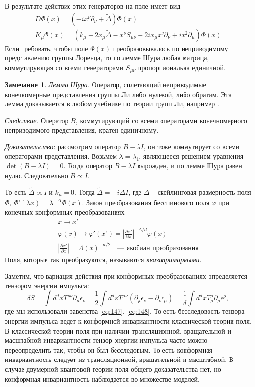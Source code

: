 \documentclass[a4paper,12pt]{article}
\theoremstyle{definition}
\theoremstyle{definition}
\newtheorem{mynote}{Замечание}[section]
\theoremstyle{definition}
\begin{document}
В результате действие этих генераторов на поле имеет вид
\begin{eqnarray}
  \label{eq:181}
  D\Phi(x)=(-ix^{\nu}\partial_{\nu}+\tilde \Delta)\Phi(x)\\
  K_{\mu}\Phi(x)=(k_{\mu}+2x_{\mu}\tilde\Delta -x^{\nu}S_{\mu\nu}-2ix_{\mu}x^{\nu}\partial_{\nu}+ix^{2} \partial_{\mu})\Phi(x)
\end{eqnarray}
Если требовать, чтобы поле $\Phi(x)$ преобразовывалось по неприводимому представлению группы Лоренца, то по лемме Шура любая матрица, коммутирующая со всеми генераторами $S_{\mu\nu}$ пропорциональна единичной.  
\begin{mynote}
  
  {\it Лемма Шура}. Оператор, сплетающий неприводимые конечномерные представления группы Ли либо нулевой, либо обратим. Эта лемма доказывается в любом учебнике по теории групп Ли, например \cite{golod2001}. 

  {\it Следствие}. Оператор $B$, коммутирующий со всеми операторами конечномерного неприводимого представления, кратен единичному.

  {\it Доказательство}: рассмотрим оператор $B-\lambda I$, он тоже коммутирует со всеми операторами представления. Возьмем $\lambda=\lambda_1$, являющееся решением уравнения $\det (B-\lambda I)=0$. Тогда оператор $B-\lambda I$ вырожден, и по лемме Шура равен нулю. Следовательно $B\propto I$.
\end{mynote}

То есть $\tilde \Delta\propto I$ и $k_{\mu}=0$. Тогда $\tilde \Delta =-i \Delta I$, где $\Delta$ -- скейлинговая размерность поля $\Phi$, $\Phi'(\lambda x)=\lambda^{-\Delta}\Phi(x)$. Закон преобразования бесспинового поля $\varphi$ при конечных конформных преобразованиях
\begin{eqnarray}
  \label{eq:182}
  x\to x'\\
  \varphi(x)\to \varphi'(x')=\left|\frac{\partial x'}{\partial x}\right|^{-\Delta/d}\varphi(x)\\
  \left|\frac{\partial x'}{\partial x}\right|=\Lambda(x)^{-d/2}    \quad\mbox{--- якобиан преобразования}
\end{eqnarray}
Поля, которые так преобразуются, называются {\it квазипримарными}.

Заметим, что  вариация действия при конформных преобразованиях определяется тензором энергии импульса:
\begin{equation}
  \label{eq:183}
  \delta S=\int d^{d}x T^{\mu\nu}\partial_{\mu}\epsilon_{\nu}=\frac{1}{2} \int d^{d}x T^{\mu\nu}(\partial_{\mu}\epsilon_{\nu}-\partial_{\nu}\epsilon_{\mu})=\frac{1}{d}\int d^{d}x T^{\mu}_{\mu}\partial_{\rho}\epsilon^{\rho},
\end{equation}
где мы использовали равенства \eqref{eq:147}, \eqref{eq:148}. То есть бесследовость тензора энергии-импульса ведет к конформной инвариантности классической теории поля. В классической теории поля при наличии трансляционной, вращательной и масштабной инвариантности  тензор энергии-импульса часто можно переопределить так, чтобы он был бесследовым. То есть конформная инвариантность следует из трансляционной, вращательной и масштабной. В случае двумерной квантовой теории поля общего доказательства нет, но конформная инвариантность наблюдается во множестве моделей. 
\end{document}
